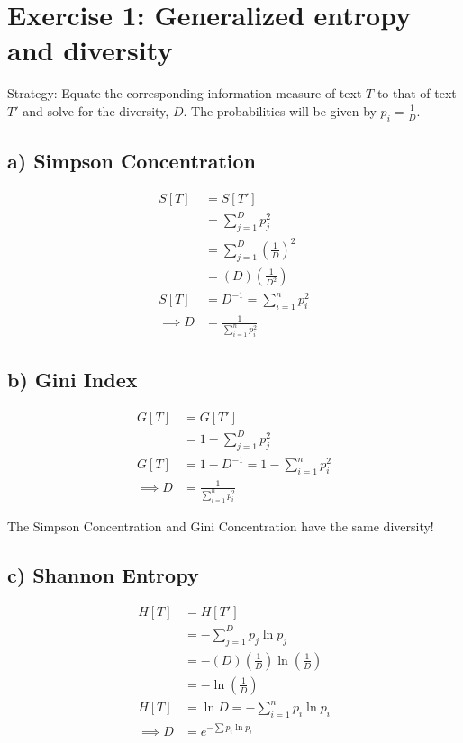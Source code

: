 \documentclass{article}
\begin{document}
\section{Exercise 1: Generalized entropy and diversity}

Strategy: Equate the corresponding information measure of text $T$ to that of text $T'$ and solve for the diversity, $D$. The probabilities will be given by $p_i = \frac{1}{D}$.

\subsection{a) Simpson Concentration}
\begin{align}
S[T] &= S[T'] \\
&= \sum_{j=1}^{D} p_j^2 \\
&= \sum_{j=1}^{D} (\frac{1}{D})^2 \\
&= (D) (\frac{1}{D^2}) \\
S[T] &= D^{-1} = \sum_{i=1}^{n} p_i^2 \\
\implies D &= \frac{1}{\sum_{i=1}^{n} p_i^2}
\end{align}

\subsection{b) Gini Index}
\begin{align}
G[T] &= G[T'] \\
&= 1 - \sum_{j=1}^{D} p_j^2 \\
G[T ] &= 1 - D^{-1} = 1 - \sum_{i=1}^{n} p_i^2 \\
\implies D &= \frac{1}{\sum_{i=1}^{n} p_i^2} 
\end{align}

The Simpson Concentration and Gini Concentration have the same diversity! 

\subsection{c) Shannon Entropy}
\begin{align}
H[T] &= H[T'] \\
&= - \sum_{j=1}^D p_j \ln p_j \\
&= - (D) (\frac{1}{D}) \ln (\frac{1}{D}) \\
&= -\ln(\frac{1}{D}) \\
H[T] &= \ln D = - \sum_{i=1}^{n} p_i \ln p_i \\
\implies D &= e^{-\sum p_i \ln p_i}
\end{align}
\end{document}
